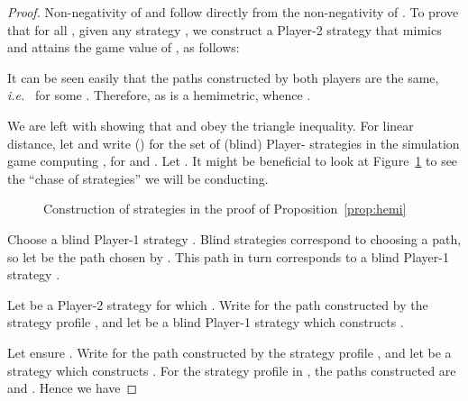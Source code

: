 \documentclass[copyright,creativecommons,sharealike]{eptcs}
\theoremstyle{plain}
\newcommand*\ie{\textit{i.e.}}
\begin{document}
\begin{proof}
  Non-negativity of  and  follow directly from the
  non-negativity of .  To prove that 
  for all , given any strategy , we
  construct a Player-2 strategy  that mimics
   and attains the game value of , as follows:
  
  It can be seen easily that the paths constructed by both players are
  the same, \ie~ for some . Therefore,  as  is a hemimetric,
  whence .

  We are left with showing that  and  obey the triangle
  inequality.  For linear distance, let  and write
   () for the set of (blind)
  Player- strategies in the simulation game computing , for  and .  Let
  .
  It might be beneficial to look at Figure~\ref{fig:strategychase} to
  see the ``chase of strategies'' we will be conducting.

  \begin{figure}[tp]
    \centering
    \caption{\label{fig:strategychase} Construction of strategies in the
      proof of Proposition~\ref{prop:hemi}}
  \end{figure}

  Choose a blind Player-1 strategy .  Blind strategies correspond to choosing a
  path, so let  be the path chosen by . This path in turn corresponds to a blind Player-1 strategy
  .

  Let  be a Player-2 strategy
  for which .  Write  for the path
  constructed by the strategy profile , and let  be a
  blind Player-1 strategy which constructs .

  Let  ensure .  Write
   for the path constructed by the strategy
  profile , and let  be a strategy which constructs .
  For the strategy profile  in
  , the paths constructed are  and
  .  Hence we have
  


\end{proof}
\end{document}
